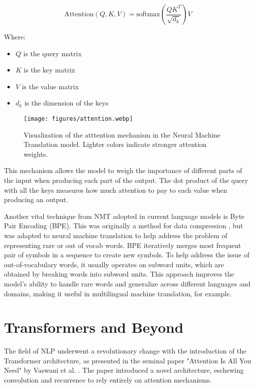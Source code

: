 \documentclass[a4paper, oneside]{discothesis}
\begin{document}
\begin{equation}
\text{Attention}(Q, K, V) = \text{softmax}\left(\frac{QK^T}{\sqrt{d_k}}\right)V
\end{equation}

Where:
\begin{itemize}
    \item $Q$ is the query matrix
    \item $K$ is the key matrix
    \item $V$ is the value matrix
    \item $d_k$ is the dimension of the keys
\end{itemize}

\begin{figure}[h]
    \centering
    \texttt{[image: figures/attention.webp]}
    \caption{Visualization of the atttention mechanism in the Neural Machine Translation model. Lighter colors indicate stronger attention weights.}
    \label{fig:nmt_self_attention}
\end{figure}

This mechanism allows the model to weigh the importance of different parts of the input when producing each part of the output. The dot product of the query with all the keys measures how much attention to pay to each value when producing an output.

Another vital technique from NMT adopted in current language models is Byte Pair Encoding (BPE). This was originally a method for data compression \cite{PhilipGage1994}, but was adapted to neural machine translation to help address the problem of representing rare or out of vocab words\cite{sennrich2015neural}. BPE iteratively merges most frequent pair of symbols in a sequence to create new symbols. To help address the issue of out-of-vocabulary words, it usually operates on subword units, which are obtained by breaking words into subword units. This approach improves the model's ability to handle rare words and generalize across different languages and domains, making it useful in multilingual machine translation, for example.

\section{Transformers and Beyond}
The field of NLP underwent a revolutionary change with the introduction of the Transformer architecture, as presented in the seminal paper "Attention Is All You Need" by Vaswani et al. \cite{vaswani2017attention}. The paper introduced a novel architecture, eschewing convolution and recurrence to rely entirely on attention mechanisms.
\end{document}
